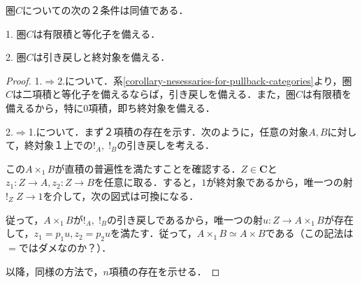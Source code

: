 \documentclass[uplatex, 12pt, dvipdfmx]{jsarticle}
\begin{document}
\begin{proposition}
    圏$C$についての次の２条件は同値である．

    1. 圏$C$は有限積と等化子を備える．

    2. 圏$C$は引き戻しと終対象を備える．
\end{proposition}
\begin{proof}
    1.$\Rightarrow$2.について．系\ref{corollary-nesessaries-for-pullback-categories}より，圏$C$は二項積と等化子を備えるならば，引き戻しを備える．また，圏$C$は有限積を備えるから，特に$0$項積，即ち終対象を備える．

    2.$\Rightarrow$1.について．まず２項積の存在を示す．次のように，任意の対象$A,B$に対して，終対象１上での$!_A,\;!_B$の引き戻しを考える．
    \begin{center}
    \end{center}
    この$A\times_1B$が直積の普遍性を満たすことを確認する．$Z\in\mathbf{C}$と$z_1:Z\to A,z_2:Z\to B$を任意に取る．すると，$1$が終対象であるから，唯一つの射$!_Z\;Z\to 1$を介して，次の図式は可換になる．
    \begin{center}
    \end{center}
    従って，$A\times_1B$が$!_A,\;!_B$の引き戻しであるから，唯一つの射$u:Z\to A\times_1B$が存在して，$z_1=p_1u,z_2=p_2u$を満たす．従って，$A\times_1B\simeq A\times B$である（この記法は$=$ではダメなのか？）．

    以降，同様の方法で，$n$項積の存在を示せる．


\end{proof}
\end{document}
